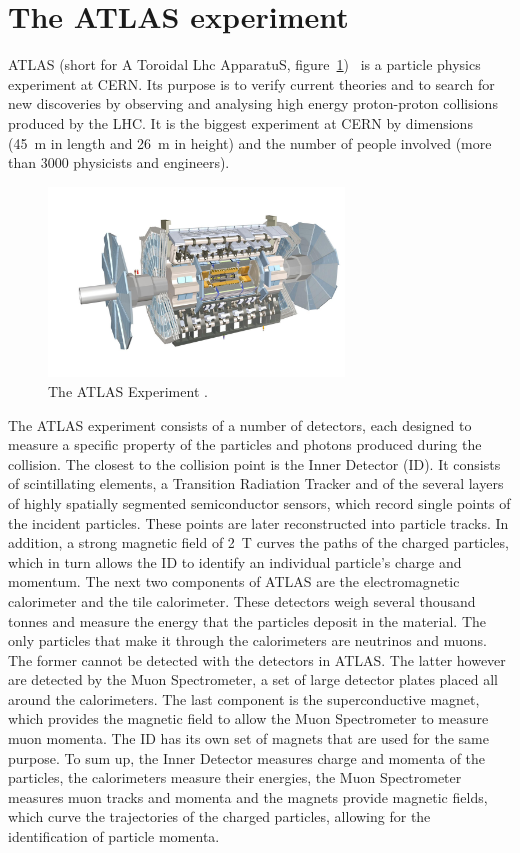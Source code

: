 \section{The ATLAS experiment}
ATLAS (short for A Toroidal Lhc ApparatuS, figure~\ref{fig:atlas})~\cite{Jenni:1193085} is a particle physics experiment at CERN. Its purpose is to verify current theories and to search for new discoveries by observing and analysing high energy proton-proton collisions produced by the LHC. It is the biggest experiment at CERN by dimensions (45~m in length and 26~m in height) and the number of people involved (more than 3000 physicists and engineers).
\begin{figure}[!t]
\centering
\includegraphics[width=0.7\textwidth]{01_introduction/pics/atlas3}
\caption{The ATLAS Experiment \cite{Pequenao:1095924}.}
\label{fig:atlas}
\end{figure}
The ATLAS experiment consists of a number of detectors, each designed to measure a specific property of the particles and photons produced during the collision. The closest to the collision point is the Inner Detector (ID). It consists of scintillating elements, a Transition Radiation Tracker and of the several layers of highly spatially segmented semiconductor sensors, which record single points of the incident particles. These points are later reconstructed into particle tracks. In addition, a strong magnetic field of 2~T curves the paths of the charged particles, which in turn allows the ID to identify an individual particle's charge and momentum. The next two components of ATLAS are the electromagnetic calorimeter and the tile calorimeter. These detectors weigh several thousand tonnes and measure the energy that the particles deposit in the material. The only particles that make it through the calorimeters are neutrinos and muons. The former cannot be detected with the detectors in ATLAS. The latter however are detected by the Muon Spectrometer, a set of large detector plates placed all around the calorimeters. The last component is the superconductive magnet, which provides the magnetic field to allow the Muon Spectrometer to measure muon momenta. The ID has its own set of magnets that are used for the same purpose. To sum up, the Inner Detector measures charge and momenta of the particles, the calorimeters measure their energies, the Muon Spectrometer measures muon tracks and momenta and the magnets provide magnetic fields, which curve the trajectories of the charged particles, allowing for the identification of particle momenta.

